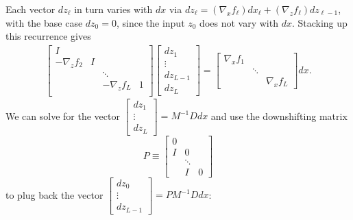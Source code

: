 \documentclass{article}
\begin{document}
Each vector $dz_\ell$ in turn varies with $dx$ via $dz_\ell = (\nabla_x f_\ell)
    dx_\ell + (\nabla_z f_\ell) dz_{\ell-1}$, with the base case $dz_0 = 0$, since
the input $z_0$ does not vary with $dx$. Stacking up this recurrence gives
\begin{align}
    \begin{bmatrix}
        I             &   &                   \\
        -\nabla_z f_2 & I &                   \\
                      &   & \ddots            \\
                      &   & -\nabla_z f_L & 1 \\
    \end{bmatrix}
    \begin{bmatrix}
        dz_1 \\ \vdots \\ dz_{L-1}  \\ dz_L
    \end{bmatrix}
    =
    \begin{bmatrix}
        \nabla_x f_1 &        &              \\
                     & \ddots &              \\
                     &        & \nabla_x f_L
    \end{bmatrix}
    dx.
\end{align}
We can solve for the vector $\begin{bmatrix}
        dz_1 \\ \vdots \\ dz_L
    \end{bmatrix}
    = M^{-1} D dx$ and use the downshifting matrix
\begin{equation}
    P \equiv \begin{bmatrix}
        0 \\ I & 0 \\ &\ddots \\ &I&0
    \end{bmatrix}
\end{equation}
to plug back the vector $\begin{bmatrix}
        dz_0 \\ \vdots \\ dz_{L-1}
    \end{bmatrix}
    =PM^{-1}D dx$:
\end{document}
